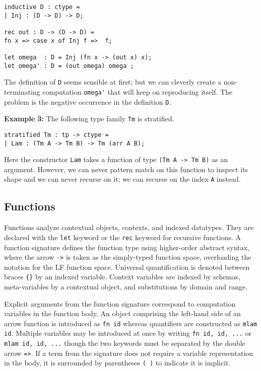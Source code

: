 \documentclass[11pt]{article}
\begin{document}
\begin{verbatim}
inductive D : ctype =
| Inj : (D -> D) -> D;

rec out : D -> (D -> D) =
fn x => case x of Inj f =>  f;

let omega  : D = Inj (fn x -> (out x) x);
let omega' : D = (out omega) omega ;
\end{verbatim}

The definition of \verb+D+ seems sensible at first; but we can cleverly create a non-terminating computation \verb+omega'+ that will keep on reproducing itself.
The problem is the negative occurrence in the definition \verb+D+.


\textbf{Example 3:} The following type family \verb+Tm+ is stratified.
\begin{verbatim}
stratified Tm : tp -> ctype =
| Lam : (Tm A -> Tm B) -> Tm (arr A B);
\end{verbatim}

Here the constructor \verb+Lam+ takes a function of type \verb+(Tm A -> Tm B)+ as an argument.
However, we can never pattern match on this function to inspect its shape and we can never recurse on it; we can recurse on the index \lstinline!A! instead.

\subsection{Functions}

Functions analyze contextual objects, contexts, and indexed datatypes.
They are declared with the \verb+let+ keyword or the \verb+rec+ keyword for recursive functions.
A function signature defines the function type using higher-order abstract syntax, where the arrow \verb+->+ is taken as the simply-typed function space, overloading the notation for the LF function space.
Universal quantification is denoted between braces \verb+{}+ by an indexed variable.
Context variables are indexed by schemas, meta-variables by a contextual object, and substitutions by domain and range.

Explicit arguments from the function signature correspond to computation variables in the function body.
An object comprising the left-hand side of an arrow function is introduced as \verb+fn id+ whereas quantifiers are constructed as \verb+mlam id+.
Multiple variables may be introduced at once by writing \verb+fn id, id, ...+ or \verb+mlam id, id, ...+ though the two keywords must be separated by the double arrow \verb+=>+.
If a term from the signature does not require a variable representation in the body, it is surrounded by parentheses \verb+( )+ to indicate it is implicit.
\end{document}
